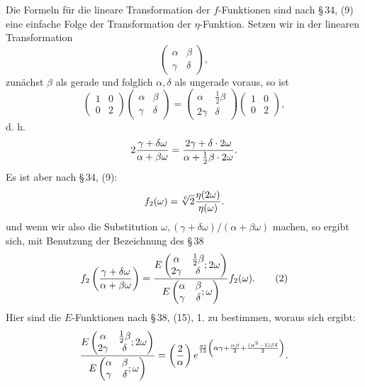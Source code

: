 \documentclass[11pt]{article}
\newcommand{\Jac}[2]{\left(\frac{#1}{#2}\right)}
\begin{document}
Die Formeln für die lineare Transformation der $f$-Funktionen sind nach \S\,34, (9) eine einfache Folge der Transformation der $\eta$-Funktion. Setzen wir in der linearen Transformation
\[
\begin{pmatrix}\alpha&\beta\\ \gamma&\delta\end{pmatrix},
\]
zunächst $\beta$ als gerade und folglich $\alpha,\delta$ als ungerade voraus, so ist
\begin{equation}
\begin{pmatrix}1&0\\0&2\end{pmatrix}
\begin{pmatrix}\alpha&\beta\\ \gamma&\delta\end{pmatrix}
=\begin{pmatrix}\alpha&\frac12\beta\\2\gamma&\delta\end{pmatrix}
\begin{pmatrix}1&0\\0&2\end{pmatrix},
\tag{1}
\end{equation}
d. h.
\[
2{\gamma+
\delta\omega\over\alpha+
\beta\omega}
={2\gamma+
\delta\cdot2\omega\over\alpha+\frac12\beta\cdot2\omega}.
\]
Es ist aber nach \S\,34, (9):
\[
f_2(\omega)=\sqrt[6]{2}{\eta(2\omega)\over\eta(\omega)}.
\]
und wenn wir also die Substitution $\omega, (\gamma+
\delta\omega)/(\alpha+
\beta\omega)$ machen, so ergibt sich, mit Benutzung der Bezeichnung des \S\,38
\begin{equation}
f_2\left({\gamma+
\delta\omega\over\alpha+
\beta\omega}\right)
={E\left(\begin{matrix}\alpha&\frac12\beta\\2\gamma&\delta\end{matrix};2\omega\right)
\over
E\left(\begin{matrix}\alpha&\beta\\\gamma&\delta\end{matrix};\omega\right)}f_2(\omega). 
\tag{2}
\end{equation}
Hier sind die $E$-Funktionen nach \S\,38, (15), 1. zu bestimmen, woraus sich ergibt:
\[
{E\left(\begin{matrix}\alpha&\frac12\beta\\2\gamma&\delta\end{matrix};2\omega\right)
\over
E\left(\begin{matrix}\alpha&\beta\\\gamma&\delta\end{matrix};\omega\right)}
=
\Jac{2}{\alpha}e^{{\pi i\over12}\left(\alpha\gamma+{\alpha\beta\over2}+{(\alpha^2-1)\beta\delta\over2}\right)}.
\]
\end{document}
